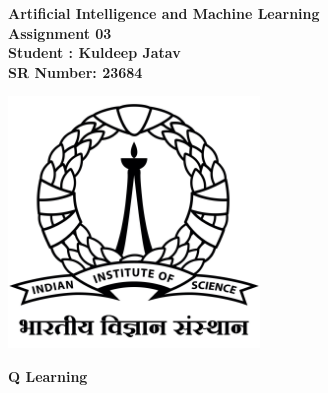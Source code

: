 \documentclass{article}
\begin{document}
    \thispagestyle{empty}
    \begin{center}
        \huge{\textbf{Artificial Intelligence and Machine Learning}} \\ 
        \vspace{1cm}
        \huge{\textbf{Assignment 03}} \\ 
        \vspace{2cm}
        \huge{\textbf{Student : Kuldeep Jatav}} \\
        \vspace{0.5cm}
        \huge{\textbf{SR Number: 23684}} \\ 
        \vspace{3cm}

        \includegraphics[width=0.5\textwidth]{IIScLogo.jpg}
    \end{center}
    
    \newpage
\noindent    \textbf{Q Learning}    
\end{document}
